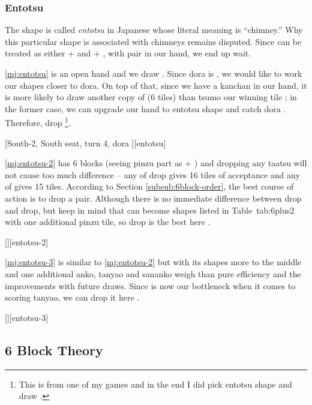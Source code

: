 \documentclass[12pt]{article}
\newlength\stdbls %
\newcommand{\mjfn}[1]{\raisebox{-.135\stdbls}{\mahjong[0.75\stdbls]{#1}}}
\begin{document}
\subsubsection{Entotsu}

The shape  is called \textit{entotsu} in Japanese whose literal meaning is ``chimney.'' Why this particular shape is associated with chimneys remains disputed. Since  can be treated as either  +  and  + , with  pair in our hand, we end up  wait.

\ref{mj:entotsu} is an open hand and we draw . Since dora is , we would like to work our shapes closer to dora. On top of that, since we have a kanchan  in our hand, it is more likely to draw another copy of  (6 tiles) than tsumo our winning tile ; in the former case, we can upgrade our hand to entotsu shape and catch dora . Therefore, drop \footnote{This is from one of my games and in the end I did pick entotsu shape and draw \mjfn{8m}.}.

[South-2, South seat, turn 4, dora ][entotsu]

\ref{mj:entotsu-2} has 6 blocks (seeing pinzu part as  +  ) and dropping any taatsu will not cause too much difference -- any of  drop gives 16 tiles of acceptance and any of  gives 15 tiles. According to Section \ref{subsub:6block-order}, the best course of action is to drop a pair. Although there is no immediate difference between  drop and  drop, but keep in mind that  can become shapes listed in Table~{tab:6plus2} with one additional pinzu tile, so  drop is the best here \citep[][p.~130]{uzaku-haikouritsu}.

[][entotsu-2]

\ref{mj:entotsu-3} is similar to \ref{mj:entotsu-2} but with its shapes more to the middle and one additional anko, tanyao and sananko weigh than pure efficiency and the improvements with future draws. Since  is now our bottleneck when it comes to scoring tanyao, we can drop it here \citep[][p.~131]{uzaku-haikouritsu}.

[][entotsu-3]


\subsection{6 Block Theory} \label{subsec:6block}
\end{document}
